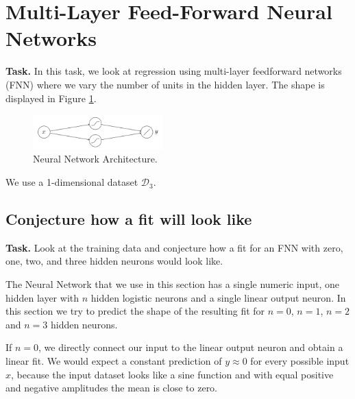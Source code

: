 \documentclass{support/acm_proc_article-sp}
\begin{document}
    \newpage


    \section{Multi-Layer Feed-Forward Neural Networks}

    \textbf{Task.} In this task, we look at regression using multi-layer feedforward networks (FNN) where we vary the
    number of units in the hidden layer.
    The shape is displayed in Figure \ref{fig:neural-network-architecture}.
    \begin{figure}[!htbp]
        \centering
        \includegraphics[width=5cm]{images/neural-network-architecture.png}
        \caption{Neural Network Architecture.}
        \label{fig:neural-network-architecture}
    \end{figure}
    We use a 1-dimensional dataset $\mathcal{D}_3$.


    \subsection{Conjecture how a fit will look like}
    \label{sec:conjecture-fit}

    \textbf{Task.} Look at the training data and conjecture how a fit for an FNN with zero, one, two, and three hidden
    neurons would look like.

    The Neural Network that we use in this section has a single numeric input, one hidden layer with $n$ hidden logistic
    neurons and a single linear output neuron.
    In this section we try to predict the shape of the resulting fit for $n=0$, $n=1$, $n=2$ and $n=3$ hidden neurons.

    If $n=0$, we directly connect our input to the linear output neuron and obtain a linear fit.
    We would expect a constant prediction of $y \approx 0$ for every possible input $x$, because the input dataset
    looks like a sine function and with equal positive and negative amplitudes the mean is close to zero.
\end{document}
